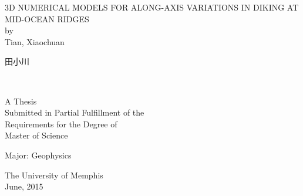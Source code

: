 
\thispagestyle{empty}  %


\begin{center}


\uppercase{3D Numerical Models for Along-axis Variations in Diking at Mid-Ocean Ridges}
\\
\vspace{10pt}
by
\vspace{10pt}
\\
Tian, Xiaochuan
\\
\begin{CJK}{UTF8}{gbsn}
田小川
\end{CJK}
\\
\vspace{100pt}

A Thesis
\\
Submitted in Partial Fulfillment of the 
\\
Requirements for the Degree of 
\\
Master of Science
\\
\vspace{35pt}

Major: Geophysics
\\

\vspace{120pt}

The University of Memphis
\\

June, 2015

\end{center}

\restoregeometry

